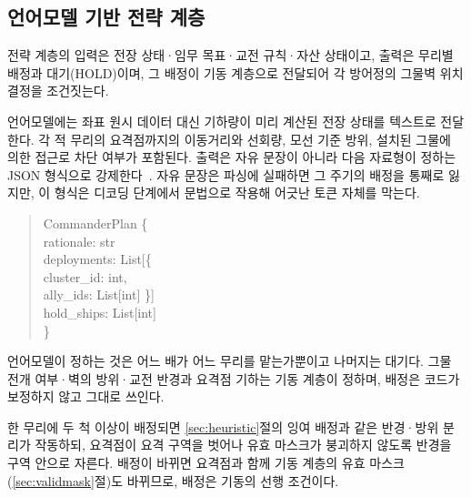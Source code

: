 \subsection{언어모델 기반 전략 계층}
\label{sec:commander}
\label{sec:schema}

전략 계층의 입력은 전장 상태·임무 목표·교전 규칙·자산 상태이고, 출력은 무리별 배정과 대기(HOLD)이며, 그 배정이 기동 계층으로 전달되어 각
방어정의 그물벽 위치 결정을 조건짓는다.

언어모델에는 좌표 원시 데이터 대신 기하량이 미리 계산된 전장 상태를 텍스트로 전달한다.
각 적 무리의 요격점까지의 이동거리와 선회량, 모선 기준 방위, 설치된 그물에 의한 접근로 차단
여부가 포함된다. 출력은 자유 문장이 아니라 다음 자료형이 정하는 JSON
형식으로 강제한다~\citep{openai2026function}. 자유 문장은 파싱에 실패하면 그 주기의 배정을
통째로 잃지만, 이 형식은 디코딩 단계에서 문법으로 작용해 어긋난 토큰 자체를 막는다.

\begin{quote}\ttfamily\scriptsize\setlength{\parindent}{0pt}
CommanderPlan \{\\
\hspace*{1.2em} rationale: str\\
\hspace*{1.2em} deployments: List[\{\\
\hspace*{3.0em} cluster\_id: int,\\
\hspace*{3.0em} ally\_ids: List[int] \}]\\
\hspace*{1.2em} hold\_ships: List[int]\\
\}
\end{quote}

언어모델이 정하는 것은 어느 배가 어느 무리를 맡는가뿐이고 나머지는 대기다. 그물 전개
여부·벽의 방위·교전 반경과 요격점 기하는 기동 계층이 정하며, 배정은 코드가 보정하지 않고
그대로 쓰인다.

한 무리에 두 척 이상이 배정되면 \ref{sec:heuristic}절의 잉여 배정과 같은 반경·방위 분리가
작동하되, 요격점이 요격 구역을 벗어나 유효 마스크가 붕괴하지 않도록 반경을 구역 안으로 자른다.
배정이 바뀌면 요격점과 함께 기동 계층의 유효 마스크(\ref{sec:validmask}절)도 바뀌므로, 배정은
기동의 선행 조건이다.
